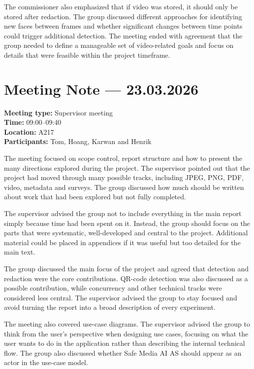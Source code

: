 The commissioner also emphasized that if video was stored, it should only be stored after redaction. The group discussed different approaches for identifying new faces between frames and whether significant changes between time points could trigger additional detection. The meeting ended with agreement that the group needed to define a manageable set of video-related goals and focus on details that were feasible within the project timeframe.

\section{Meeting Note --- 23.03.2026}
\label{app:meeting-2026-03-23}
\textbf{Meeting type:} Supervisor meeting\\
\textbf{Time:} 09:00--09:40\\
\textbf{Location:} A217\\
\textbf{Participants:} Tom, Hoang, Karwan and Henrik

The meeting focused on scope control, report structure and how to present the many directions explored during the project. The supervisor pointed out that the project had moved through many possible tracks, including JPEG, PNG, PDF, video, metadata and surveys. The group discussed how much should be written about work that had been explored but not fully completed.

The supervisor advised the group not to include everything in the main report simply because time had been spent on it. Instead, the group should focus on the parts that were systematic, well-developed and central to the project. Additional material could be placed in appendices if it was useful but too detailed for the main text.

The group discussed the main focus of the project and agreed that detection and redaction were the core contributions. QR-code detection was also discussed as a possible contribution, while concurrency and other technical tracks were considered less central. The supervisor advised the group to stay focused and avoid turning the report into a broad description of every experiment.

The meeting also covered use-case diagrams. The supervisor advised the group to think from the user's perspective when designing use cases, focusing on what the user wants to do in the application rather than describing the internal technical flow. The group also discussed whether Safe Media AI AS should appear as an actor in the use-case model.

